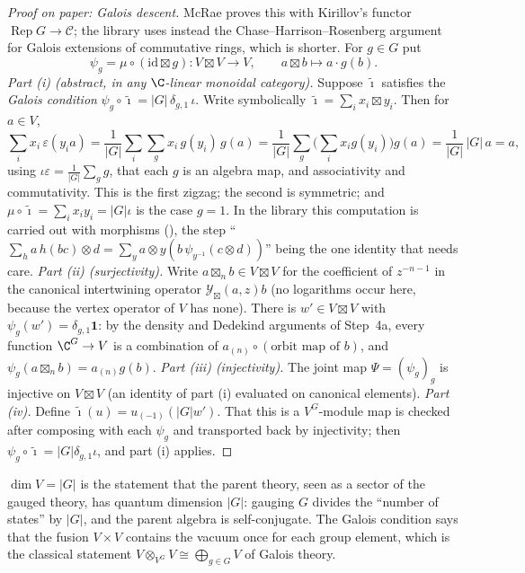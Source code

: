 \begin{proof}[Proof on paper: Galois descent]
McRae proves this with Kirillov's functor $\operatorname{Rep}G\to\mathcal C$; the library uses instead the
Chase--Harrison--Rosenberg argument for Galois extensions of commutative rings, which is shorter. For $g\in G$ put
\begin{equation*}
  \psi_g=\mu\circ(\mathrm{id}\boxtimes g):V\boxtimes V\to V,\qquad a\boxtimes b\mapsto a\cdot g(b).
\end{equation*}
\emph{Part (i) (abstract, in any $\C$-linear monoidal category).} Suppose $\tilde\imath$ satisfies the \emph{Galois
condition} $\psi_g\circ\tilde\imath=|G|\,\delta_{g,1}\,\iota$. Write symbolically $\tilde\imath=\sum_ix_i\boxtimes y_i$.
Then for $a\in V$,
\begin{equation*}
  \sum_i x_i\,\varepsilon(y_ia)=\frac1{|G|}\sum_i\sum_{g}x_i\,g(y_i)\,g(a)
  =\frac1{|G|}\sum_g\Big(\sum_ix_ig(y_i)\Big)g(a)=\frac1{|G|}\,|G|\,a=a,
\end{equation*}
using $\iota\varepsilon=\frac1{|G|}\sum_gg$, that each $g$ is an algebra map, and associativity and commutativity.
This is the first zigzag; the second is symmetric; and $\mu\circ\tilde\imath=\sum_ix_iy_i=|G|\iota$ is the case $g=1$.
In the library this computation is carried out with morphisms (), the step ``$\sum_h
a\,h(bc)\otimes d=\sum_y a\otimes y(b\,\psi_{y^{-1}}(c\otimes d))$'' being the one identity that needs care.
\emph{Part (ii) (surjectivity).} Write $a\boxtimes_nb\in V\boxtimes V$ for the coefficient of $z^{-n-1}$ in the canonical
intertwining operator $\mathcal Y_\boxtimes(a,z)b$ (no logarithms occur here, because the vertex operator of $V$ has none).
There is $w'\in V\boxtimes V$ with $\psi_g(w')=\delta_{g,1}\mathbf 1$: by the density and
Dedekind arguments of Step~4a, every function $\C^G\to V$ is a combination of $a_{(n)}\circ(\text{orbit map of }b)$, and
$\psi_g(a\boxtimes_nb)=a_{(n)}g(b)$. \emph{Part (iii) (injectivity).} The joint map $\Psi=(\psi_g)_g$ is injective on
$V\boxtimes V$ (an identity of part (i) evaluated on canonical elements). \emph{Part (iv).} Define $\tilde\imath(u)=u_{(-1)}
(|G|w')$. That this is a $V^G$-module map is checked after composing with each $\psi_g$ and transported back by
injectivity; then $\psi_g\circ\tilde\imath=|G|\delta_{g,1}\iota$, and part (i) applies.
\end{proof}

\begin{physics}
$\dim V=|G|$ is the statement that the parent theory, seen as a sector of the gauged theory, has quantum dimension
$|G|$: gauging $G$ divides the ``number of states'' by $|G|$, and the parent algebra is self-conjugate. The Galois
condition says that the fusion $V\times V$ contains the vacuum once for each group element, which is the classical
statement $V\otimes_{V^G}V\cong\bigoplus_{g\in G}V$ of Galois theory.
\end{physics}

